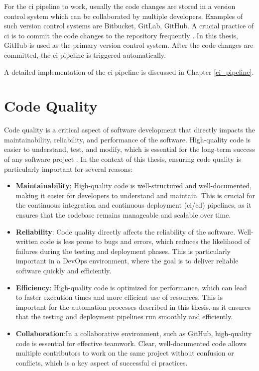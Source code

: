     For the \acrshort{ci} pipeline to work, usually the code changes are stored in a version control system which can be collaborated by multiple developers.
    Examples of such version control systems are Bitbucket, GitLab, GitHub. A crucial practice of \acrshort{ci} is to commit the code changes to the repository 
    frequently \cite{6802994}. In this thesis, GitHub is used as the primary version control system. After the code changes are committed, the \acrshort{ci} 
    pipeline is triggered automatically. 

    A detailed implementation of the \acrshort{ci} pipeline is discussed in Chapter \ref{ci_pipeline}. 

\section{Code Quality}

Code quality is a critical aspect of software development that directly impacts the maintainability, reliability, and performance of the software. High-quality 
code is easier to understand, test, and modify, which is essential for the long-term success of any software project \cite{6862882}. In the context of this thesis, ensuring 
code quality is particularly important for several reasons:

\begin{itemize}
    \item \textbf{Maintainability}:\newline 
    High-quality code is well-structured and well-documented, making it easier for developers to understand and maintain. This is crucial for the continuous 
    integration and continuous deployment (\acrshort{ci}/\acrshort{cd}) pipelines, as it ensures that the codebase remains manageable and scalable over time.
    \item \textbf{Reliability}:\newline 
    Code quality directly affects the reliability of the software. Well-written code is less prone to bugs and errors, which reduces the likelihood of failures 
    during the testing and deployment phases. This is particularly important in a DevOps environment, where the goal is to deliver reliable software quickly 
    and efficiently.
    \item \textbf{Efficiency}:\newline 
    High-quality code is optimized for performance, which can lead to faster execution times and more efficient use of resources. This is important for the 
    automation processes described in this thesis, as it ensures that the testing and deployment pipelines run smoothly and efficiently.
    \item \textbf{Collaboration}:\newline In a collaborative environment, such as GitHub, high-quality code is essential for effective teamwork. Clear, 
    well-documented code allows multiple contributors to work on the same project without confusion or conflicts, which is a key aspect of successful \acrshort{ci} 
    practices.
\end{itemize}

